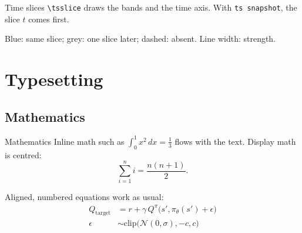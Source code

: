 \documentclass[aspectratio=169,onlytextwidth]{beamer}
\begin{document}
\begin{frame}{Time slices}
  \texttt{\textbackslash tsslice} draws the bands and the time axis.
  With \texttt{ts snapshot}, the slice $t$ comes first.

  \vfill
  \centering

  \vspace{2pt}
  {\scriptsize \textcolor{uzh@blue}{Blue}: same slice;
  \textcolor{black!50}{grey}: one slice later;
  \textcolor{uzh@berry}{dashed}: absent. Line width: strength.\par}
\end{frame}


\section{Typesetting}

\subsection{Mathematics}

\begin{frame}{Mathematics}
  Inline math such as $\int_0^1 x^2 \, dx = \tfrac{1}{3}$ flows with the text.
  Display math is centred:
  \[
    \sum_{i=1}^{n} i = \frac{n(n+1)}{2}.
  \]

  Aligned, numbered equations work as usual:
  \begin{align}
    Q_{\text{target}} &= r + \gamma\, Q^\pi\big(s', \pi_\theta(s') + \epsilon\big) \\
    \epsilon &\sim \mathrm{clip}\big(\mathcal{N}(0,\sigma), -c, c\big) \nonumber
  \end{align}
\end{frame}
\end{document}
